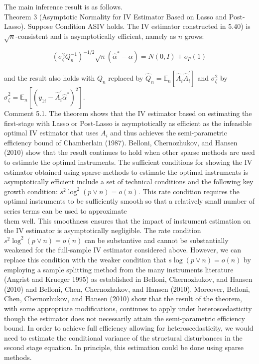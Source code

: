\documentclass[10pt]{article}
\begin{document}
The main inference result is as follows.\\
Theorem 3 (Asymptotic Normality for IV Estimator Based on Lasso and Post-Lasso). Suppose Condition ASIV holds. The IV estimator constructed in 5.40) is \(\sqrt{n}\)-consistent and is asymptotically efficient, namely as \(n\) grows:

\[
\left(\sigma_{\zeta}^{2} Q_{n}^{-1}\right)^{-1 / 2} \sqrt{n}\left(\widehat{\alpha}^{*}-\alpha\right)=N(0, I)+o_{P}(1)
\]

and the result also holds with \(Q_{n}\) replaced by \(\widehat{Q}_{n}=\mathbb{E}_{n}\left[\widehat{A}_{i} \widehat{A}_{i}^{\prime}\right]\) and \(\sigma_{\zeta}^{2}\) by \(\widehat{\sigma}_{\zeta}^{2}=\mathbb{E}_{n}\left[\left(y_{1 i}-\widehat{A}_{i}^{\prime} \widehat{\alpha}^{*}\right)^{2}\right]\).\\
Comment 5.1. The theorem shows that the IV estimator based on estimating the first-stage with Lasso or Post-Lasso is asymptotically as efficient as the infeasible optimal IV estimator that uses \(A_{i}\) and thus achieves the semi-parametric efficiency bound of Chamberlain (1987). Belloni, Chernozhukov, and Hansen (2010) show that the result continues to hold when other sparse methods are used to estimate the optimal instruments. The sufficient conditions for showing the IV estimator obtained using sparse-methods to estimate the optimal instruments is asymptotically efficient include a set of technical conditions and the following key growth condition: \(s^{2} \log ^{2}(p \vee n)=o(n)\). This rate condition requires the optimal instruments to be sufficiently smooth so that a relatively small number of series terms can be used to approximate\\
them well. This smoothness ensures that the impact of instrument estimation on the IV estimator is asymptotically negligible. The rate condition \(s^{2} \log ^{2}(p \vee n)=o(n)\) can be substantive and cannot be substantially weakened for the full-sample IV estimator considered above. However, we can replace this condition with the weaker condition that \(s \log (p \vee n)=o(n)\) by employing a sample splitting method from the many instruments literature (Angrist and Krueger 1995) as established in Belloni, Chernozhukov, and Hansen (2010) and Belloni, Chen, Chernozhukov, and Hansen (2010). Moreover, Belloni, Chen, Chernozhukov, and Hansen (2010) show that the result of the theorem, with some appropriate modifications, continues to apply under heteroscedasticity though the estimator does not necessarily attain the semi-parametric efficiency bound. In order to achieve full efficiency allowing for heteroscedasticity, we would need to estimate the conditional variance of the structural disturbances in the second stage equation. In principle, this estimation could be done using sparse methods.
\end{document}
